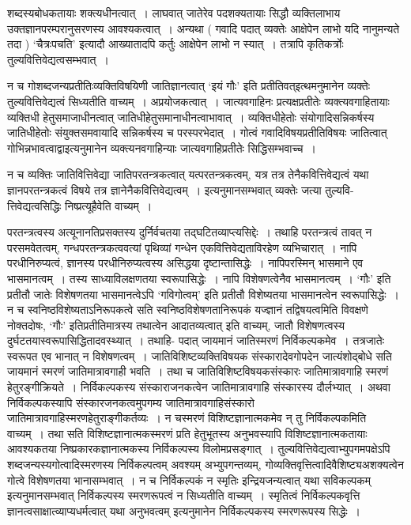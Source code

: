{शब्दस्यबोधकतायाः शक्त्यधीनत्वात्~। लाघवात् जातेरेव पदशक्यतायाः सिद्धौ व्यक्तिलाभाय उक्तज्ञानपरम्परानुसरणस्य आवश्यकत्वात्~। अन्यथा ( गवादि पदात् व्यक्तेः आक्षेपेन लाभो यदि नानुमन्यते तदा ) ‘चैत्रःपचति’ इत्यादौ आख्यातादपि कर्तुः आक्षेपेन लाभो न स्यात्~। तत्रापि कृतिकर्त्रोः तुल्यवित्तिवेद्यत्वसम्भवात्~। 

न च गोशब्दजन्यप्रतीतिःव्यक्तिविषयिणी जातिज्ञानत्वात् ‘इयं गौः’ इति प्रतीतिवत्\break इत्थमनुमानेन व्यक्तेः तुल्यवित्तिवेद्यत्वं सिध्यतीति वाच्यम्~। अप्रयोजकत्वात्~।  जात्यवगाहिनः प्रत्यक्षप्रतीतेः व्यक्त्यवगाहितायाः व्यक्तिधी हेतुसमाजाधीनत्वात् जातिधीहेतुसमाना\-धीनत्वाभावात्~। व्यक्तिधीहेतोः संयोगादिसन्निकर्षस्य जातिधीहेतोः संयुक्तसमवायादि सन्नि\-कर्षस्य च परस्परभेदात्~। गोत्वं गवादिविषयप्रतीतिविषयः जातित्वात् गोभिन्नभावत्वाद्वा\break इत्यनुमानेन व्यक्त्यनवगाहिन्याः जात्यवगाहिप्रतीतेः सिद्धिसम्भवाच्च~। 

न च व्यक्तिः जातिवित्तिवेद्या जातिपरतन्त्रकत्वात् यत्परतन्त्रकत्वम्, यत्र तत्र तेनैकवित्तिवेद्यत्वं यथा ज्ञानपरतन्त्रकत्वं विषये तत्र ज्ञानेनैकवित्तिवेद्यत्वम्~। इत्यनुमानसम्भवात् व्यक्तेः जत्या तुल्यवि- त्तिवेद्यत्वसिद्धिः निष्प्रत्यूहैवेति वाच्यम्~। 

परतन्त्रत्वस्य अत्यूनानतिप्रसक्तस्य दुर्निर्वचतया तद्घटितव्याप्त्यसिद्देः~। तथाहि पर\-तन्त्रत्वं तावत् न परसमवेतत्वम्, गन्धपरतन्त्रकत्ववत्यां पृथिव्यां गन्धेन एकवित्तिवेद्यताविरहेण व्यभि\-चारात्~। नापि परधीनिरुप्यत्वं, ज्ञानस्य परधीनिरुप्यत्वस्य असिद्धया दृष्टान्तासिद्धेः~। नापि\break परस्मिन् भासमाने एव भासमानत्वम्~। तस्य साध्याविलक्षणतया स्वरूपासिद्धेः~। नापि विशेषण\-त्वेनैव भासमानत्वम्~। ‘गौः’ इति प्रतीतौ जातेः विशेषणतया भासमानत्वेऽपि ‘गवि\break गोत्वम्’ इति प्रतीतौ विशेष्यतया भासमानत्वेन स्वरूपासिद्धेः~। न च स्वनिष्ठविशेष्यताऽनिरूप\-कत्वे सति स्वनिष्ठविशेषणतानिरूपकं यज्ज्ञानं तद्विषयत्वमिति विवक्षणे नोक्तदोषः, ‘गौः’ इति\break प्रतीतिमात्रस्य तथात्वेन आदातव्यत्वात् इति वाच्यम्, जातौ विशेषणत्वस्य दुर्घटतया\break स्वरूपासिद्धितादवस्थ्यात्~। तथाहि- पदात् जायमानं जातिस्मरणं निर्विकल्पकमेव~। तत्र\break जातेः स्वरूपत एव भानात् न विशेषणत्वम्~। जातिविशिष्टव्यक्तिविषयक संस्कारादेव\break गोपदेन जात्यंशोद्बोधे सति जायमानं स्मरणं जातिमात्रावगाही भवति~। तथा च जातिविशिष्टविषयकसंस्कारः जातिमात्रावगाहि स्मरणं हेतुरङ्गीक्रियते~। निर्विकल्पकस्य संस्काराजनकत्वेन जातिमात्रावगाहि संस्कारस्य दौर्लभ्यात्~। अथवा निर्विकल्पकस्यापि संस्कारजनकत्वमुपगम्य जातिमात्रावगाहिसंस्कारो जातिमात्रावगाहिस्मरणहेतुराङ्गीकर्तव्यः~। न च\break स्मरणं विशिष्टज्ञानात्मकमेव न् तु निर्विकल्पकमिति वाच्यम्~। तथा सति विशिष्टज्ञानात्मकस्मरणं प्रति हेतुभूतस्य अनुभवस्यापि विशिष्टज्ञानात्मकतायाः आवश्यकतया निष्प्रकारकज्ञानात्मकस्य निर्वि\-कल्पस्य विलोमप्रसङ्गात्~। तुल्यवित्तिवेद्यत्वाभ्युपगमपक्षेऽपि शब्दजन्यस्य\break गोत्वादिस्मरणस्य निर्विकल्पत्वम् अवश्यम् अभ्युपगन्तव्यम्, गोव्यक्तिवृत्तित्वादिवैशिष्ट्य\break अशक्यत्वेन गोत्वे विशेषणतया भानासम्भवात्~। न च निर्विकल्पकं न स्मृतिः इन्द्रियजन्यत्वात् यथा सविकल्पकम् इत्यनुमानसम्भवात् निर्विकल्पस्य स्मरणरूपत्वं न सिध्यतीति वाच्यम्~। स्मृतित्वं निर्विकल्पकवृत्ति ज्ञानत्वसाक्षात्व्याप्यधर्मत्वात् यथा अनुभवत्वम् इत्यनुमानेन निर्विकल्पकस्य स्मरणरूपस्य सिद्धेः~। 

}

